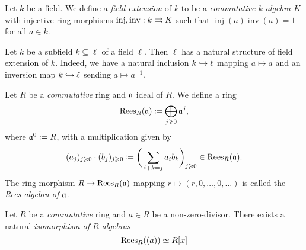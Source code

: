 \begin{definition}
\label{def:field-extension}
Let \(k\) be a field. We define a \emph{field extension} of \(k\) to be a
\emph{commutative \(k\)-algebra} \(K\) with injective ring morphisms
\(\operatorname{inj}, \operatorname{inv}: k \rightrightarrows K\) such that
\(\operatorname{inj}(a) \operatorname{inv}(a) = 1\) for all \(a \in k\).
\end{definition}

\begin{example}
\label{exp:subfield-natural-field-extension}
Let \(k\) be a subfield \(k \subseteq \ell\) of a field \(\ell\). Then \(\ell\)
has a natural structure of field extension of \(k\). Indeed, we have a natural
inclusion \(k \hookrightarrow \ell\) mapping \(a \mapsto a\) and an inversion map
\(k \hookrightarrow \ell\) sending \(a \mapsto a^{-1}\).
\end{example}

\begin{definition}
\label{def:rees-algebra}
Let \(R\) be a \emph{commutative} ring and \(\mathfrak{a}\) ideal of \(R\). We
define a ring
\[
\operatorname{Rees}_R(\mathfrak{a}) \coloneq \bigoplus_{j \geqslant 0} \mathfrak{a}^j,
\]
where \(\mathfrak{a}^0 \coloneq R\), with a multiplication given by
\[
(a_j)_{j \geqslant 0} \cdot (b_j)_{j \geqslant 0} \coloneq
\bigg( \sum_{i + k = j} a_i b_k \bigg)_{j \geqslant 0}
\in \operatorname{Rees}_R(\mathfrak{a}).
\]
The ring morphism \(R \to \operatorname{Rees}_R(\mathfrak{a})\) mapping
\(r \mapsto (r, 0, \dots, 0, \dots)\) is called the \emph{Rees algebra of
  \(\mathfrak{a}\)}.
\end{definition}

\begin{proposition}
\label{prop:rees-algebra-iso-R[x]}
Let \(R\) be a \emph{commutative} ring and \(a \in R\) be a
non-zero-divisor. There exists a natural \emph{isomorphism of \(R\)-algebras}
\[
\operatorname{Rees}_R((a)) \simeq R[x]
\]
\end{proposition}

